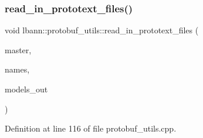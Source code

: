 \subsubsection{\texorpdfstring{read\+\_\+in\+\_\+prototext\+\_\+files()}{read\_in\_prototext\_files()}}
{\footnotesize\ttfamily void lbann\+::protobuf\+\_\+utils\+::read\+\_\+in\+\_\+prototext\+\_\+files (\begin{DoxyParamCaption}\item[{bool}]{master,  }\item[{std\+::vector$<$ \hyperlink{structlbann_1_1prototext__fn__triple}{prototext\+\_\+fn\+\_\+triple} $>$ \&}]{names,  }\item[{std\+::vector$<$ lbann\+\_\+data\+::\+Lbann\+PB $\ast$$>$ \&}]{models\+\_\+out }\end{DoxyParamCaption})\hspace{0.3cm}{\ttfamily [static]}}



Definition at line 116 of file protobuf\+\_\+utils.\+cpp.


